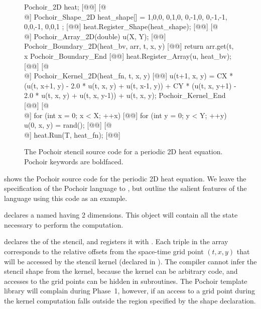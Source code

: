 \begin{figure}[t]
\begin{center-code}
\lstset{language=Pochoir_bf}
\begin{pochoir-listing}
Pochoir_2D heat; [@\label{li:heat:Pochoir:decl}@] [@\\@]
Pochoir_Shape_2D heat_shape[] = { {1,0,0}, {0,1,0}, {0,-1,0}, {0,-1,-1}, {0,0,-1}, {0,0,1} }; [@\label{li:heat:Shape:decl}@] 
heat.Register_Shape(heat_shape); [@\label{li:heat:regShape}@] [@\\@]
Pochoir_Array_2D(double) u(X, Y); [@\label{li:heat:Array:decl}@] 
Pochoir_Boundary_2D(heat_bv, arr, t, x, y) [@\label{li:heat:Boundary:begin}@]
    return arr.get(t, x%
Pochoir_Boundary_End [@\label{li:heat:Boundary:end}@]
heat.Register_Array(u, heat_bv); [@\label{li:heat:regArray}@] [@\\@]
Pochoir_Kernel_2D(heat_fn, t, x, y) [@\label{li:heat:Kernel:begin}@]
    u(t+1, x, y) = CX * (u(t, x+1, y) - 2.0 * u(t, x, y) + u(t, x-1, y)) + CY * (u(t, x, y+1) - 2.0 * u(t, x, y) + u(t, x, y-1)) + u(t, x, y);
Pochoir_Kernel_End [@\label{li:heat:Kernel:end}@] [@\\@]
for (int x = 0; x < X; ++x) [@\label{li:heat:init:begin}@]
  for (int y = 0; y < Y; ++y)    
     u(0, x, y) = rand();  [@\label{li:heat:init:end}@]  [@\\@]
heat.Run(T, heat_fn); [@\label{li:heat:run}@]
\end{pochoir-listing}
\end{center-code}  
\caption{The Pochoir stencil source code for a periodic 2D heat
  equation.  Pochoir keywords are boldfaced.}
\label{fig:2DHeat}
\end{figure}

 shows the Pochoir source code for the periodic 2D heat
equation.  We leave the specification of the Pochoir language to
, but outline the salient features of the language using
this code as an example.

 declares a  named
 having 2 dimensions.  This object will contain all the
state necessary to perform the computation.

 declares the  of the
stencil, and  registers it with .
Each triple in the array  corresponds to the relative
offsets from the space-time grid point $(t, x, y)$ that will be
accessed by the stencil kernel (declared in
).  The compiler cannot
infer the stencil shape from the kernel, because the kernel can be
arbitrary code, and accesses to the grid points can be hidden in
subroutines.  The Pochoir template library will complain during
Phase~1, however, if an access to a grid point during the kernel
computation falls outside the region specified by the shape
declaration.

